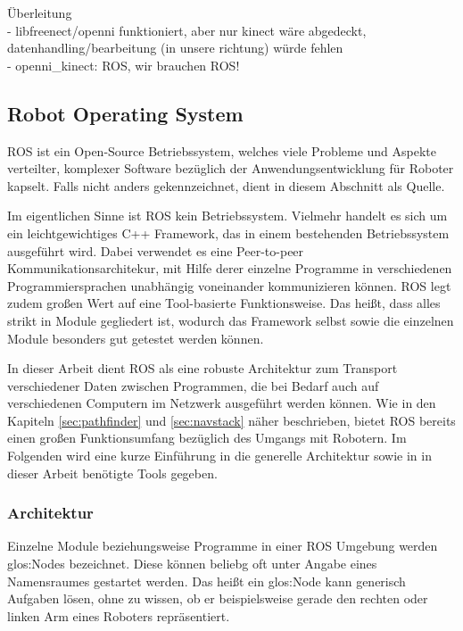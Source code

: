 {\color{red}
Überleitung\\
- libfreenect/openni funktioniert, aber nur kinect wäre abgedeckt, datenhandling/bearbeitung (in unsere richtung) würde fehlen\\
- openni\_kinect: ROS, wir brauchen ROS!\\
}

\subsection{Robot Operating System}

\gls{ROS} ist ein Open-Source Betriebssystem, welches viele Probleme und Aspekte verteilter, komplexer Software bezüglich der Anwendungsentwicklung für Roboter kapselt. Falls nicht anders gekennzeichnet, dient \cite{Quigley:2009kx} in diesem Abschnitt als Quelle.

Im eigentlichen Sinne ist \gls{ROS} kein Betriebssystem. Vielmehr handelt es sich um ein leichtgewichtiges C++ Framework, das in einem bestehenden Betriebssystem ausgeführt wird. Dabei verwendet es eine Peer-to-peer Kommunikationsarchitekur, mit Hilfe derer einzelne Programme in verschiedenen Programmiersprachen unabhängig voneinander kommunizieren können. \gls{ROS} legt zudem großen Wert auf eine Tool-basierte Funktionsweise. Das heißt, dass alles strikt in Module gegliedert ist, wodurch das Framework selbst sowie die einzelnen Module besonders gut getestet werden können.

In dieser Arbeit dient \gls{ROS} als eine robuste Architektur zum Transport verschiedener Daten zwischen Programmen, die bei Bedarf auch auf verschiedenen Computern im Netzwerk ausgeführt werden können. Wie in den Kapiteln \ref{sec:pathfinder} und \ref{sec:navstack} näher beschrieben, bietet \gls{ROS} bereits einen großen Funktionsumfang bezüglich des Umgangs mit Robotern. Im Folgenden wird eine kurze Einführung in die generelle Architektur sowie in in dieser Arbeit benötigte Tools gegeben.

\subsubsection{Architektur}

Einzelne Module beziehungsweise Programme in einer \gls{ROS} Umgebung werden \glspl{glos:Node} bezeichnet. Diese können beliebg oft unter Angabe eines Namensraumes gestartet werden. Das heißt ein \gls{glos:Node} kann generisch Aufgaben lösen, ohne zu wissen, ob er beispielsweise gerade den rechten oder linken Arm eines Roboters repräsentiert.

